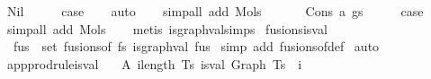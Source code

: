 \begin{isabellebody}
\ Nil\isanewline
\ \ \isamarkupfalse%
\ \isamarkupfalse%
\ {\isacharquery}{\kern0pt}case\isanewline
\ \ \isamarkupfalse%
\ auto\isanewline
\ \ \isamarkupfalse%
\ {\isacharparenleft}{\kern0pt}simp{\isacharunderscore}{\kern0pt}all\ add{\isacharcolon}{\kern0pt}\ Mols{}{\isacharparenright}{\kern0pt}\isanewline
\ \ \isamarkupfalse%
\isanewline
{}\isamarkupfalse%
\isanewline
\ \ \isamarkupfalse%
\ {\isacharparenleft}{\kern0pt}Cons\ a\ gs{\isacharparenright}{\kern0pt}\isanewline
\ \ \isamarkupfalse%
\ \isamarkupfalse%
\ {\isacharquery}{\kern0pt}case\isanewline
\ \ \isamarkupfalse%
\ {\isacharparenleft}{\kern0pt}simp{\isacharunderscore}{\kern0pt}all\ add{\isacharcolon}{\kern0pt}\ Mols{}{\isacharparenright}{\kern0pt}\isanewline
\ \ \isamarkupfalse%
\ {\isacharparenleft}{\kern0pt}metis\ is{\isacharunderscore}{\kern0pt}graph{\isacharunderscore}{\kern0pt}val{\isachardot}{\kern0pt}simps{\isacharparenleft}{\kern0pt}{}{\isacharparenright}{\kern0pt}{\isacharparenright}{\kern0pt}\isanewline
{}\isamarkupfalse%
%
\endisatagproof
{\isafoldproof}%
%
\isadelimproof
\isanewline
%
\endisadelimproof
\isanewline
\isanewline
{}\isamarkupfalse%
\ fusions{\isacharunderscore}{\kern0pt}is{\isacharunderscore}{\kern0pt}val{\isacharcolon}{\kern0pt}\isanewline
\ \ {\isachardoublequoteopen}{\isasymforall}fus\ {\isasymin}\ set\ {\isacharparenleft}{\kern0pt}fusions{\isacharunderscore}{\kern0pt}of\ fs{\isacharparenright}{\kern0pt}{\isachardot}{\kern0pt}\ is{\isacharunderscore}{\kern0pt}graph{\isacharunderscore}{\kern0pt}val\ fus{\isachardoublequoteclose}\isanewline
%
\isadelimproof
%
\endisadelimproof
%
\isatagproof
{}\isamarkupfalse%
\ {\isacharparenleft}{\kern0pt}simp\ add{\isacharcolon}{\kern0pt}\ fusions{\isacharunderscore}{\kern0pt}of{\isacharunderscore}{\kern0pt}def{\isacharparenright}{\kern0pt}\isanewline
{}\isamarkupfalse%
\ auto%
\endisatagproof
{\isafoldproof}%
%
\isadelimproof
\isanewline
%
\endisadelimproof
\isanewline
\isanewline
{}\isamarkupfalse%
\ app{\isacharunderscore}{\kern0pt}prodrule{\isacharunderscore}{\kern0pt}is{\isacharunderscore}{\kern0pt}val{\isacharcolon}{\kern0pt}\isanewline
\ \ \ A{}{\isacharcolon}{\kern0pt}\ {\isachardoublequoteopen}{\isasymforall}i{\isacharless}{\kern0pt}length\ Ts{\isachardot}{\kern0pt}\ is{\isacharunderscore}{\kern0pt}val\ {\isacharparenleft}{\kern0pt}Graph\ {\isacharparenleft}{\kern0pt}Ts\ {\isacharbang}{\kern0pt}\ i{\isacharparenright}{\kern0pt}{\isacharparenright}{\kern0pt}{\isachardoublequoteclose}\isanewline

\end{isabellebody}

